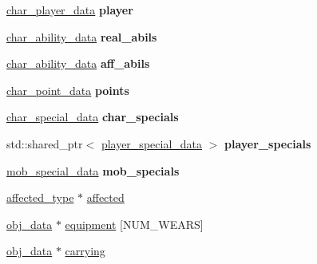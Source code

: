 \begin{DoxyCompactItemize}
\item 
\mbox{\label{structchar__data_a75b82fac9eebaacfa7038b1d06069b52}} 
\hyperlink{structchar__player__data}{char\+\_\+player\+\_\+data} {\bfseries player}
\item 
\mbox{\label{structchar__data_aca56dcee7b9fc0919ac9875eab696a5b}} 
\hyperlink{structchar__ability__data}{char\+\_\+ability\+\_\+data} {\bfseries real\+\_\+abils}
\item 
\mbox{\label{structchar__data_ab904ddc218792ebbf1a33a7eac50f8b4}} 
\hyperlink{structchar__ability__data}{char\+\_\+ability\+\_\+data} {\bfseries aff\+\_\+abils}
\item 
\mbox{\label{structchar__data_a693cd99d477ab6a01efea5c3b2072e12}} 
\hyperlink{structchar__point__data}{char\+\_\+point\+\_\+data} {\bfseries points}
\item 
\mbox{\label{structchar__data_ab0d042d8272775822aac9077026cb465}} 
\hyperlink{structchar__special__data}{char\+\_\+special\+\_\+data} {\bfseries char\+\_\+specials}
\item 
\mbox{\label{structchar__data_ae56004732cbe4aa51415c7fc1b4e72c3}} 
std\+::shared\+\_\+ptr$<$ \hyperlink{structplayer__special__data}{player\+\_\+special\+\_\+data} $>$ {\bfseries player\+\_\+specials}
\item 
\mbox{\label{structchar__data_ad56f85b86c062ced231602aa6414ee03}} 
\hyperlink{structmob__special__data}{mob\+\_\+special\+\_\+data} {\bfseries mob\+\_\+specials}
\item 
\hyperlink{structaffected__type}{affected\+\_\+type} $\ast$ \hyperlink{structchar__data_ab61e858143366048e8a6538b287f4f4f}{affected}
\item 
\hyperlink{structobj__data}{obj\+\_\+data} $\ast$ \hyperlink{structchar__data_a523ae967ecadc985b77427b4003548de}{equipment} \mbox{[}N\+U\+M\+\_\+\+W\+E\+A\+RS\mbox{]}
\item 
\hyperlink{structobj__data}{obj\+\_\+data} $\ast$ \hyperlink{structchar__data_a83029722daf46aaa509cc082063fece6}{carrying}
\item 
\mbox{\label{structchar__data_a85827fbced0075a314815a704f845639}} 

\end{DoxyCompactItemize}
